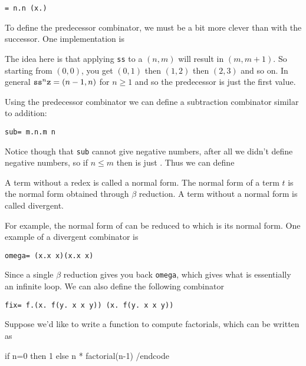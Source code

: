 \smallskip
\centerline{\tt\iszro = \lambda n.n (\lambda x.\fls) \tru}

To define the predecessor combinator, we must be a bit more clever than with the successor.
One implementation is

\smallskip
\centerline{\vbox{}}

The idea here is that applying {\tt ss} to a $(n,m)$ will result in $(m,m+1)$.
So starting from $(0,0)$, you get $(0,1)$ then $(1,2)$ then $(2,3)$ and so on.
In general ${\tt ss}^n{\tt z}=(n-1,n)$ for $n\geq1$ and so the predecessor is just the first value.

Using the predecessor combinator we can define a subtraction combinator similar to addition:

\smallskip
\centerline{\tt sub= \lambda m.\lambda n.m \prd n}

Notice though that {\tt sub} cannot give negative numbers, after all we didn't define negative numbers, so if $n\leq m$ then  is just .
Thus we can define

\smallskip
{}

\bdefn

    A term without a redex is called a {\emphcolor normal form}.
    The normal form of a term $t$ is the normal form obtained through $\beta$ reduction.
    A term without a normal form is called {\emphcolor divergent}.

\edefn

For example, the normal form of  can be reduced to  which is its normal form.
One example of a divergent combinator is

\smallskip
\centerline{\tt omega= (\lambda x.x x)(\lambda x.x x)}

Since a single $\beta$ reduction gives you back {\tt omega}, which gives what is essentially an infinite loop.
We can also define the following combinator

\smallskip
\centerline{\tt fix= \lambda f.(\lambda x. f(\lambda y. x x y)) (\lambda x. f(\lambda y. x x y))}

Suppose we'd like to write a function to compute factorials, which can be written as

\begincode
if n=0 then 1
else n * factorial(n-1)
/endcode

